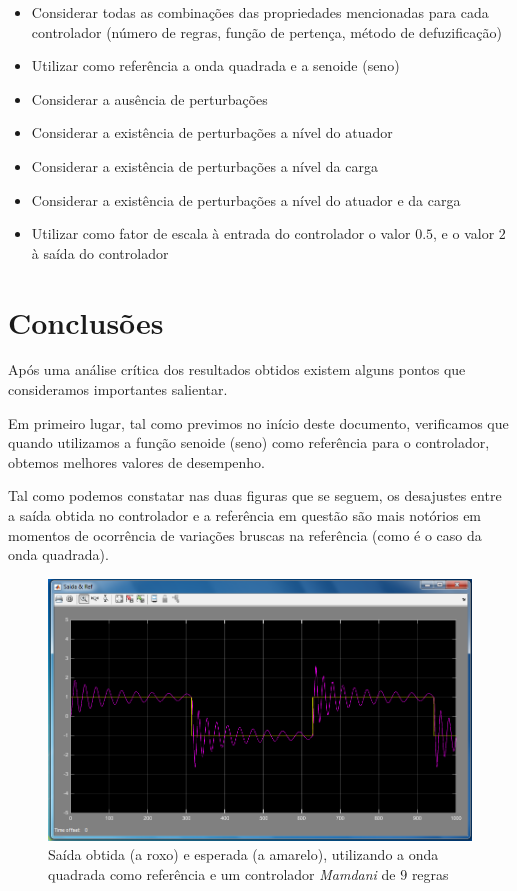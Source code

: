 \documentclass{article}
\begin{document}
\begin{itemize}
\item Considerar todas as combinações das propriedades mencionadas para cada controlador (número de regras, função de pertença, método de defuzificação)
\item Utilizar como referência a onda quadrada e a senoide (seno)
\item Considerar a ausência de perturbações
\item Considerar a existência de perturbações a nível do atuador
\item Considerar a existência de perturbações a nível da carga
\item Considerar a existência de perturbações a nível do atuador e da carga
\item Utilizar como fator de escala à entrada do controlador o valor $0.5$, e o valor $2$ à saída do controlador
\end{itemize}



\pagebreak

\section{Conclusões}

Após uma análise crítica dos resultados obtidos existem alguns pontos que consideramos importantes salientar.

Em primeiro lugar, tal como previmos no início deste documento, verificamos que quando utilizamos a função senoide (seno) como referência para o controlador, obtemos melhores valores de desempenho.

Tal como podemos constatar nas duas figuras que se seguem, os desajustes entre a saída obtida no controlador e a referência em questão são mais notórios em momentos de ocorrência de variações bruscas na referência (como é o caso da onda quadrada).

\begin{figure}[H]
  \centering
      \includegraphics[scale=0.3]{Images/Mamdani_9_square.png}
  \caption{Saída obtida (a roxo) e esperada (a amarelo), utilizando a onda quadrada como referência e um controlador \emph{Mamdani} de $9$ regras}
\end{figure}
\end{document}
